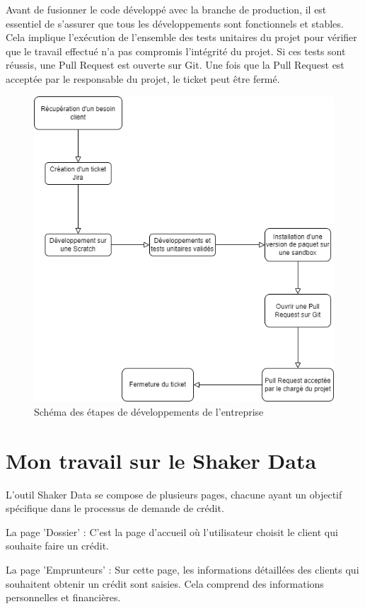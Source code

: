 \documentclass[12pt,oneside,noprintercorrection]{iut}
\begin{document}
Avant de fusionner le code développé avec la branche de production, il est essentiel de s'assurer que tous les développements sont fonctionnels et stables. Cela implique l'exécution de l'ensemble des tests unitaires du projet pour vérifier que le travail effectué n'a pas compromis l'intégrité du projet. Si ces tests sont réussis, une Pull Request est ouverte sur Git. Une fois que la Pull Request est acceptée par le responsable du projet, le ticket peut être fermé.
 
 \begin{figure}[!ht]
  \centering
  \includegraphics[width=15cm]{img/schemaEtapesDev.drawio.png}
  \caption{Schéma des étapes de développements de l'entreprise}
\end{figure}
\clearpage

\chapter{Mon travail sur le Shaker Data}
L'outil Shaker Data se compose de plusieurs pages, chacune ayant un objectif spécifique dans le processus de demande de crédit.

La page 'Dossier' : C'est la page d'accueil où l'utilisateur choisit le client qui souhaite faire un crédit.

La page 'Emprunteurs' : Sur cette page, les informations détaillées des clients qui souhaitent obtenir un crédit sont saisies. Cela comprend des informations personnelles et financières.
\end{document}
